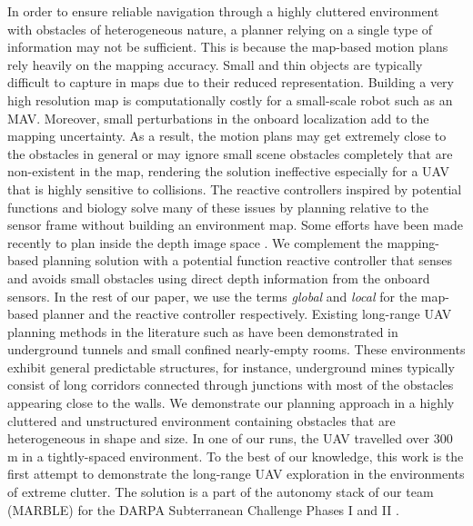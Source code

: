 \documentclass[letterpaper, 10 pt, conference]{ieeeconf}  %
\begin{document}
In order to ensure reliable navigation through a highly cluttered environment with obstacles of heterogeneous nature, a planner relying on a single type of information may not be sufficient. This is because the map-based motion plans rely heavily on the mapping accuracy. Small and thin objects are typically difficult to capture in maps due to their reduced representation. Building a very high resolution map is computationally costly for a small-scale robot such as an MAV. Moreover, small perturbations in the onboard localization add to the mapping uncertainty. As a result, the motion plans may get extremely close to the obstacles in general or may ignore small scene obstacles completely that are non-existent in the map, rendering the solution ineffective especially for a UAV that is highly sensitive to collisions. The reactive controllers inspired by potential functions \cite{khatib1986real} and biology \cite{conroy2009implementation} solve many of these issues by planning relative to the sensor frame without building an environment map. Some efforts have been made recently to plan inside the depth image space \cite{ahmad2021apf, fragoso2018dynamically, dubey2017droan, matthies2014stereo, ahmad2019real}. We complement the mapping-based planning solution with a potential function reactive controller that senses and avoids small obstacles using direct depth information from the onboard sensors. In the rest of our paper, we use the terms \textit{global} and \textit{local} for the map-based planner and the reactive controller respectively. Existing long-range UAV planning methods in the literature such as \cite{bircher2016receding,dang2019explore,Dang2020,dharmadhikari2020motion} have been demonstrated in underground tunnels and small confined nearly-empty rooms. These environments exhibit general predictable structures, for instance, underground mines typically consist of long corridors connected through junctions with most of the obstacles appearing close to the walls. We demonstrate our planning approach in a highly cluttered and unstructured environment containing obstacles that are heterogeneous in shape and size. In one of our runs, the UAV travelled over 300 m in a tightly-spaced environment. To the best of our knowledge, this work is the first attempt to demonstrate the long-range UAV exploration in the environments of extreme clutter. The solution is a part of the autonomy stack of our team (MARBLE) for the DARPA Subterranean Challenge Phases I and II \cite{ohradzansky2021mutiagent}. \par
\end{document}
